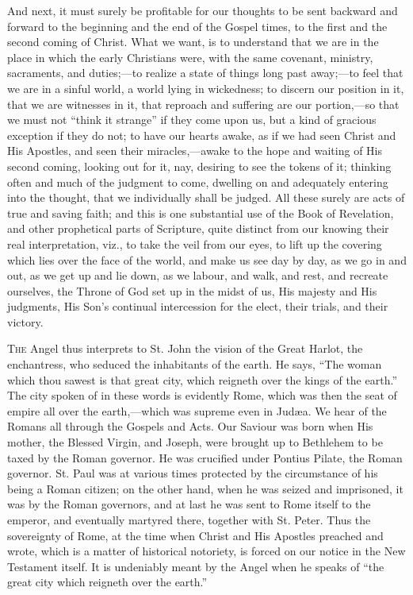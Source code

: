 And next, it must surely be profitable for our thoughts to be sent
backward and forward to the beginning and the end of the Gospel times,
to the first and the second coming of Christ. What we want, is to
understand that we are in the place in which the early Christians
were, with the same covenant, ministry, sacraments, and duties;—to
realize a state of things long past away;—to feel that we are in a
sinful world, a world lying in wickedness; to discern our position in
it, that we are witnesses in it, that reproach and suffering are our
portion,—so that we must not ``think it strange'' if they
come upon us, but a kind of gracious exception if they do not; to have
our hearts awake, as if we had seen Christ and His Apostles, and
seen their miracles,—awake to the hope and waiting of His second
coming, looking out for it, nay, desiring to see the tokens of it;
thinking often and much of the judgment to come, dwelling on and
adequately entering into the thought, that we individually shall be
judged. All these surely are acts of true and saving faith; and this
is one substantial use of the Book of Revelation, and other
prophetical parts of Scripture, quite distinct from our knowing their
real interpretation, viz., to take the veil from our eyes, to lift up
the covering which lies over the face of the world, and make us see
day by day, as we go in and out, as we get up and lie down, as we
labour, and walk, and rest, and recreate ourselves, the Throne of God
set up in the midst of us, His majesty and His judgments, His Son's
continual intercession for the elect, their trials, and their victory.


T\textsc{he} Angel thus interprets to St. John the vision of the Great
Harlot, the enchantress, who seduced the inhabitants of the earth. He
says, ``The woman which thou sawest is that great city, which
reigneth over the kings of the earth.'' The city spoken of in
these words is evidently Rome, which was then the seat of empire all
over the earth,—which was supreme even in Judæa. We hear of the
Romans all through the Gospels and Acts. Our Saviour was born when His
mother, the Blessed Virgin, and Joseph, were brought up to Bethlehem
to be taxed by the Roman governor. He was crucified under Pontius
Pilate, the Roman governor. St. Paul was at various times protected by
the circumstance of his being a Roman citizen; on the other hand, when
he was seized and imprisoned, it was by the Roman governors, and at
last he was sent to Rome itself to the emperor, and eventually
martyred there, together with St. Peter. Thus the sovereignty of Rome,
at the time when Christ and His Apostles preached and wrote, which is
a matter of historical notoriety, is forced on our notice in the New
Testament itself. It is undeniably meant by the Angel when he speaks
of ``the great city which reigneth over the earth.''


